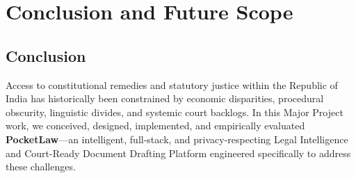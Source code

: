 \chapter{Conclusion and Future Scope}
\label{chap:conclusion}

\section{Conclusion}
\label{sec:conclusion}

Access to constitutional remedies and statutory justice within the Republic of India has historically been constrained by economic disparities, procedural obscurity, linguistic divides, and systemic court backlogs. In this Major Project work, we conceived, designed, implemented, and empirically evaluated \textbf{PocketLaw}---an intelligent, full-stack, and privacy-respecting Legal Intelligence and Court-Ready Document Drafting Platform engineered specifically to address these challenges.

